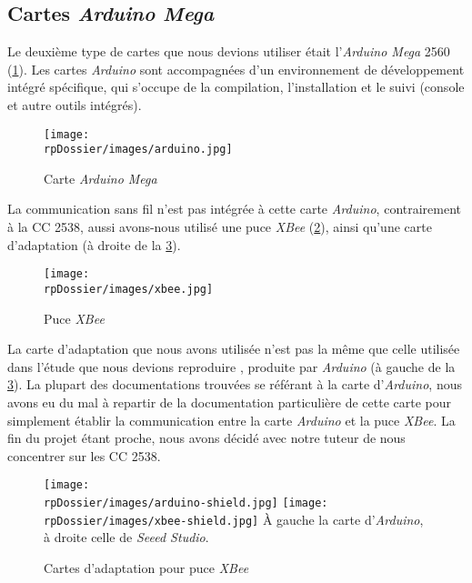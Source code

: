 \subsection{Cartes \emph{Arduino Mega}}

Le deuxième type de cartes que nous devions utiliser était l’\emph{Arduino Mega} 2560 (\cref{arduino}).
Les cartes \emph{Arduino} sont accompagnées d’un environnement de développement intégré spécifique, qui s’occupe de la compilation, l’installation et le suivi (console et autre outils intégrés).

\begin{figure}[H]
\centering
\texttt{[image: \\rpDossier/images/arduino.jpg]}
\caption{Carte \emph{Arduino Mega}}
\label{arduino}
\end{figure}

La communication sans fil n’est pas intégrée à cette carte \emph{Arduino}, contrairement à la CC 2538, aussi avons-nous utilisé une puce \emph{XBee} (\cref{xbee}), ainsi qu’une carte d’adaptation (à droite de la \cref{xbee-shields}).

\begin{figure}[H]
\centering
\texttt{[image: \\rpDossier/images/xbee.jpg]}
\caption{Puce \emph{XBee}}
\label{xbee}
\end{figure}

La carte d’adaptation que nous avons utilisée n’est pas la même que celle utilisée dans l’étude que nous devions reproduire \cite{eymery}, produite par \emph{Arduino} (à gauche de la \cref{xbee-shields}).
La plupart des documentations trouvées se référant à la carte d’\emph{Arduino}, nous avons eu du mal à repartir de la documentation particulière de cette carte  pour simplement établir la communication entre la carte \emph{Arduino} et la puce \emph{XBee}. La fin du projet étant proche, nous avons décidé avec notre tuteur de nous concentrer sur les CC 2538.

\begin{figure}[H]
\centering
\texttt{[image: \\rpDossier/images/arduino-shield.jpg]}
\texttt{[image: \\rpDossier/images/xbee-shield.jpg]}
\newline
À gauche la carte d’\emph{Arduino}, à droite celle de \emph{Seeed Studio}.
\caption{Cartes d’adaptation pour puce \emph{XBee}}
\label{xbee-shields}
\end{figure}
